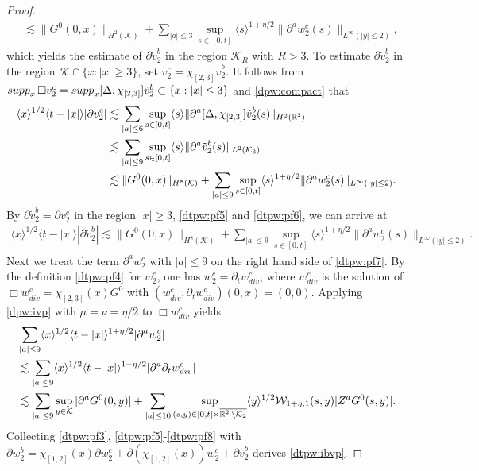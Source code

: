 \documentclass[10pt,a4paper]{amsart}
\def\R{\mathop{\mathbb R\kern 0pt}\nolimits}
\def\cK{\mathcal K}
\def\cW{\mathcal W}
\def\ls{\lesssim}
\def\p{\partial}
\def\supp{\mathop{\rm supp}\nolimits}
\newcommand{\w}[1]{\langle {#1} \rangle}
\begin{document}
\begin{proof}
\begin{equation}
\begin{split}
&\ls\|G^0(0,x)\|_{H^2(\cK)}+\sum_{|a|\le3}\sup_{s\in[0,t]}\w{s}^{1+\eta/2}\|\p^aw_2^c(s)\|_{L^\infty(|y|\le2)},
\end{split}
\end{equation}
which yields the estimate of $\p \tilde v_2^b$ in the region $\cK_R$ with $R>3$.
To estimate $\p \tilde v_2^b$ in the region $\cK\cap\{x:|x|\ge3\}$, set $v_2^c=\chi_{[2,3]}\tilde v_2^b$.
It follows from $\supp_x\Box v_2^c=\supp_x[\Delta,\chi_{[2,3]}]\tilde v_2^b\subset\{x:|x|\le3\}$ and \eqref{dpw:compact} that
\begin{equation}\label{dtpw:pf6}
\begin{split}
\w{x}^{1/2}\w{t-|x|}|\p v_2^c|
&\ls\sum_{|a|\le6}\sup_{s\in[0,t]}\w{s}\|\p^a[\Delta,\chi_{[2,3]}]\tilde v_2^b(s)\|_{H^2(\R^2)}\\
&\ls\sum_{|a|\le9}\sup_{s\in[0,t]}\w{s}\|\p^a\tilde v_2^b(s)\|_{L^2(\cK_3)}\\
&\ls\|G^0(0,x)\|_{H^8(\cK)}+\sum_{|a|\le9}\sup_{s\in[0,t]}\w{s}^{1+\eta/2}\|\p^aw_2^c(s)\|_{L^\infty(|y|\le2)}.
\end{split}
\end{equation}
By $\p \tilde v_2^b=\p v_2^c$ in the region $|x|\ge3$, \eqref{dtpw:pf5} and \eqref{dtpw:pf6}, we can arrive at
\begin{equation}\label{dtpw:pf7}
\begin{split}
\w{x}^{1/2}\w{t-|x|}|\p \tilde v_2^b|
\ls\|G^0(0,x)\|_{H^8(\cK)}+\sum_{|a|\le9}\sup_{s\in[0,t]}\w{s}^{1+\eta/2}\|\p^aw_2^c(s)\|_{L^\infty(|y|\le2)}.
\end{split}
\end{equation}
Next we treat the term $\p^aw_2^c$ with $|a|\le9$ on the right hand side of \eqref{dtpw:pf7}.
By the definition \eqref{dtpw:pf4} for $w_2^c$, one has $w_2^c=\p_tw_{div}^c$, where $w_{div}^c$ is the solution of
$\Box w_{div}^c=\chi_{[2,3]}(x)G^0$ with $(w_{div}^c,\p_tw_{div}^c)(0,x)=(0,0)$.
Applying \eqref{dpw:ivp} with $\mu=\nu=\eta/2$ to $\Box w_{div}^c$ yields
\begin{equation}\label{dtpw:pf8}
\begin{split}
&\sum_{|a|\le9}\w{x}^{1/2}\w{t-|x|}^{1+\eta/2}|\p^aw_2^c|\\
&\ls\sum_{|a|\le9}\w{x}^{1/2}\w{t-|x|}^{1+\eta/2}|\p^a\p_tw_{div}^c|\\
&\ls\sum_{|a|\le9}\sup_{y\in\cK}|\p^aG^0(0,y)|
+\sum_{|a|\le10}\sup_{(s,y)\in[0,t]\times\overline{\R^2\setminus\cK_2}}\w{y}^{1/2}\cW_{1+\eta,1}(s,y)|Z^aG^0(s,y)|.
\end{split}
\end{equation}
Collecting \eqref{dtpw:pf3}, \eqref{dtpw:pf5}-\eqref{dtpw:pf8} with $\p w_2^b=\chi_{[1,2]}(x)\p w_2^c+\p(\chi_{[1,2]}(x))w_2^c+\p\tilde v_2^b$
derives \eqref{dtpw:ibvp}.
\end{proof}
\end{document}
